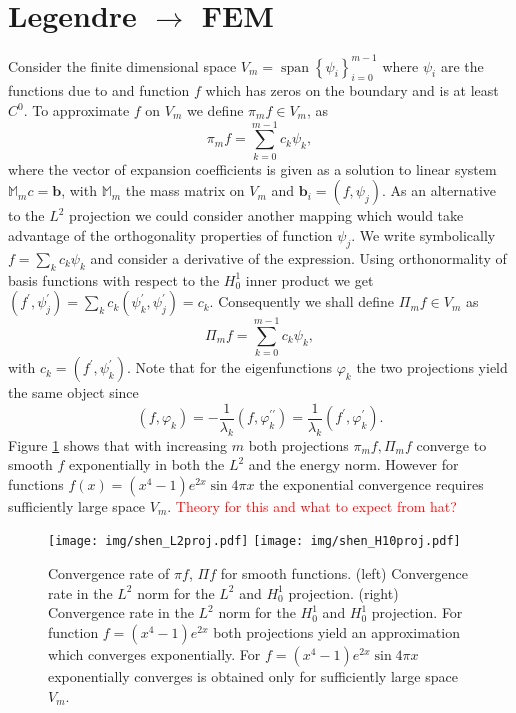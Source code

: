 \documentclass[a4paper,10pt]{article}
\newcommand{\inner}[2]{\ensuremath{\left(#1, #2\right)}}
\newcommand{\Mmmat}{\ensuremath{\mathbb{M}_m}}               %
\newcommand{\bvec}{\ensuremath{\mathbf{b}}}
\newcommand{\TODO}[1]{\textcolor{red}{#1}}
\DeclareMathOperator{\spn}{span}
\begin{document}
 \section{Legendre $\rightarrow$ FEM}
 Consider the finite dimensional space $V_m=\spn\left\{\psi_i\right\}_{i=0}^{m-1}$
 where $\psi_i$ are the functions due to \cite{shen_leg} and function $f$
 which has zeros on the boundary and is at least $C^0$. To approximate $f$ on
 $V_m$ we define $\pi_m f\in V_m$,
 as
 \[
   \pi_m f = \displaystyle\sum\limits_{k=0}^{m-1}c_k \psi_k,
 \]
 where the vector of expansion coefficients is given as a solution to linear
 system $\Mmmat c=\bvec$, with $\Mmmat$ the mass matrix on $V_m$ and
 $\bvec_i=\inner{f}{\psi_j}$. As an alternative to the $L^2$ projection we
 could consider another mapping which would take advantage of the orthogonality
 properties of function $\psi_j$.
 We write symbolically $f=\sum_k c_k\psi_k$ and consider a derivative of the
 expression. Using orthonormality of basis functions with respect to the
 $H^1_0$ inner product we get $\inner{f^{\prime}}{\psi^{\prime}_j} =
 \sum_k c_k\inner{\psi^{\prime}_k}{\psi^{\prime}_j}=c_k$. Consequently
 we shall define $\Pi_m f\in V_m$ as
 \[
   \Pi_m f = \displaystyle\sum\limits_{k=0}^{m-1}c_k \psi_k,
 \]
 with $c_k=\inner{f^{\prime}}{\psi^{\prime}_k}$. Note that for the
 eigenfunctions $\varphi_k$ the two projections yield the same object since
 \[
   \inner{f}{\varphi_k} =
   -\frac{1}{\lambda_k}\inner{f}{\varphi^{\prime\prime}_k} =
   \frac{1}{\lambda_k}\inner{f^{\prime}}{\varphi_k^{\prime}}.
 \]
  Figure \ref{fig:shen_smooth_projection} shows that with increasing $m$ both
  projections $\pi_mf, \Pi_mf$ converge to smooth $f$ exponentially in both
  the $L^2$ and the energy norm. However for functions $f(x)=(x^4-1)e^{2x}\sin{4\pi x}$
  the exponential convergence requires sufficiently large space $V_m$.
  \TODO{Theory for this and what to expect from hat?}
  
  \begin{figure}
  \begin{center}
    \texttt{[image: img/shen\_L2proj.pdf]}
    \texttt{[image: img/shen\_H10proj.pdf]}
  \end{center}
  \label{fig:shen_smooth_projection}
  \caption{Convergence rate of $\pi f$,  $\Pi f$ for smooth functions.
    (left) Convergence rate in the $L^2$ norm for the $L^2$ and $H^1_0$
    projection. (right) Convergence rate in the $L^2$ norm for the $H^1_0$
    and $H^1_0$ projection. For function $f=(x^4-1)e^{2x}$ both projections
    yield an approximation which converges exponentially. For 
    $f=(x^4-1)e^{2x}\sin{4\pi x}$ exponentially converges is obtained only for
    sufficiently large space $V_m$.
  }
  \end{figure}
\end{document}
